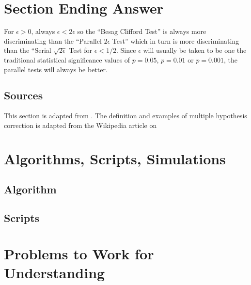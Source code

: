 \documentclass[12pt]{article}
\begin{document}
\section*{Section Ending Answer} For \( \epsilon > 0 \), always \(
\epsilon < 2 \epsilon \) so the ``Besag Clifford Test'' is always more
discriminating than the ``Parallel \( 2 \epsilon \) Test'' which in turn
is more discriminating than the ``Serial \( \sqrt{2 \epsilon} \) Test
for \( \epsilon < 1/2 \).  Since \( \epsilon \) will usually be taken to
be one the traditional statistical significance values of \( p = 0.05 \),
\( p = 0.01 \) or \( p = 0.001 \), the parallel tests will always be
better.

\subsection*{Sources} This section is adapted from
\cite{doi:10.1080/2330443X.2020.1806763}.  The definition and examples
of multiple hypothesis correction is adapted from the Wikipedia article
on 

\hr

\section*{Algorithms, Scripts, Simulations}

\subsection*{Algorithm}

\subsection*{Scripts}


\hr

\section*{Problems to Work for Understanding}
\renewcommand{\theexerciseseries}{}
\renewcommand{\theexercise}{\arabic{exercise}}
\end{document}
